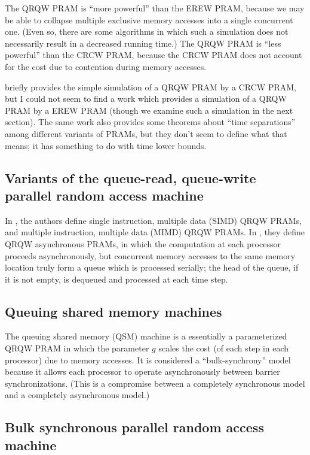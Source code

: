 \documentclass{article}
\begin{document}
The QRQW PRAM is ``more powerful'' than the EREW PRAM, because we may be able to collapse multiple exclusive memory accesses into a single concurrent one.
(Even so, there are some algorithms in which such a simulation does not necessarily result in a decreased running time.)
The QRQW PRAM is ``less powerful'' than the CRCW PRAM, because the CRCW PRAM does not account for the cost due to contention during memory accesses.

\cite{gmr98a} briefly provides the simple simulation of a QRQW PRAM by a CRCW PRAM, but I could not seem to find a work which provides a simulation of a QRQW PRAM by a EREW PRAM (though we examine such a simulation in the next section).
The same work also provides some theorems about ``time separations'' among different variants of PRAMs, but they don't seem to define what that means; it has something to do with time lower bounds.

\subsection{Variants of the queue-read, queue-write parallel random access machine}

In \cite{gmr98b}, the authors define single instruction, multiple data (SIMD) QRQW PRAMs, and multiple instruction, multiple data (MIMD) QRQW PRAMs.
In \cite{gmr98a}, they define QRQW asynchronous PRAMs, in which the computation at each processor proceeds asynchronously, but concurrent memory accesses to the same memory location truly form a queue which is processed serially; the head of the queue, if it is not empty, is dequeued and processed at each time step.

\subsection{Queuing shared memory machines}

The queuing shared memory (QSM) machine \cite{gmr99} is a essentially a parameterized QRQW PRAM in which the parameter $g$ scales the cost (of each step in each processor) due to memory accesses.
It is considered a ``bulk-synchrony'' model because it allows each processor to operate asynchronously between barrier synchronizations.
(This is a compromise between a completely synchronous model and a completely asynchronous model.)

\subsection{Bulk synchronous parallel random access machine}
\end{document}
